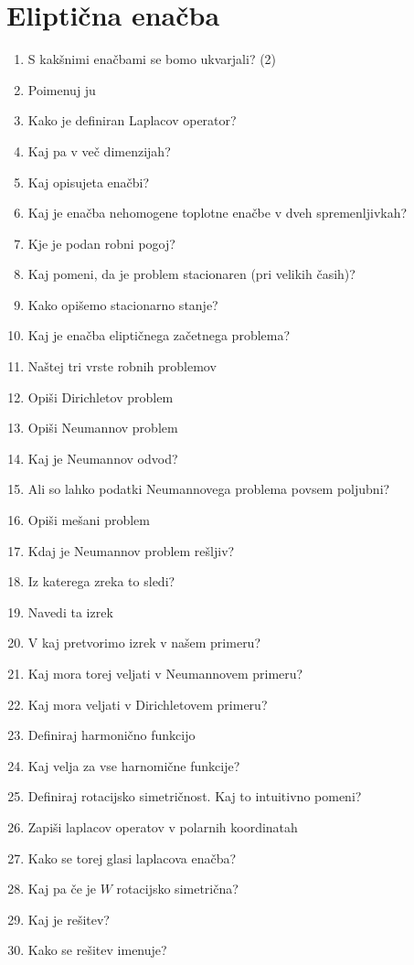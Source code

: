 \documentclass{article}
\begin{document}
    \section{Eliptična enačba}
    \begin{enumerate}
        \item S kakšnimi enačbami se bomo ukvarjali? (2)
        \item Poimenuj ju
        \item Kako je definiran Laplacov operator?
        \item Kaj pa v več dimenzijah?
        \item Kaj opisujeta enačbi?
        \item Kaj je enačba nehomogene toplotne enačbe v dveh spremenljivkah?
        \item Kje je podan robni pogoj?
        \item Kaj pomeni, da je problem stacionaren (pri velikih časih)?
        \item Kako opišemo stacionarno stanje?
        \item Kaj je enačba eliptičnega začetnega problema? 
        \item Naštej tri vrste robnih problemov
        \item Opiši Dirichletov problem
        \item Opiši Neumannov problem
        \item Kaj je Neumannov odvod?
        \item Ali so lahko podatki Neumannovega problema povsem poljubni?
        \item Opiši mešani problem
        \item Kdaj je Neumannov problem rešljiv?
        \item Iz katerega zreka to sledi?
        \item Navedi ta izrek
        \item V kaj pretvorimo izrek v našem primeru?
        \item Kaj mora torej veljati v Neumannovem primeru?
        \item Kaj mora veljati v Dirichletovem primeru?
        \item Definiraj harmonično funkcijo
        \item Kaj velja za vse harnomične funkcije?
        \item Definiraj rotacijsko simetričnost. Kaj to intuitivno pomeni?
        \item Zapiši laplacov operatov v polarnih koordinatah
        \item Kako se torej glasi laplacova enačba?
        \item Kaj pa če je $W$ rotacijsko simetrična?
        \item Kaj je rešitev?
        \item Kako se rešitev imenuje?
    \end{enumerate}
\end{document}
